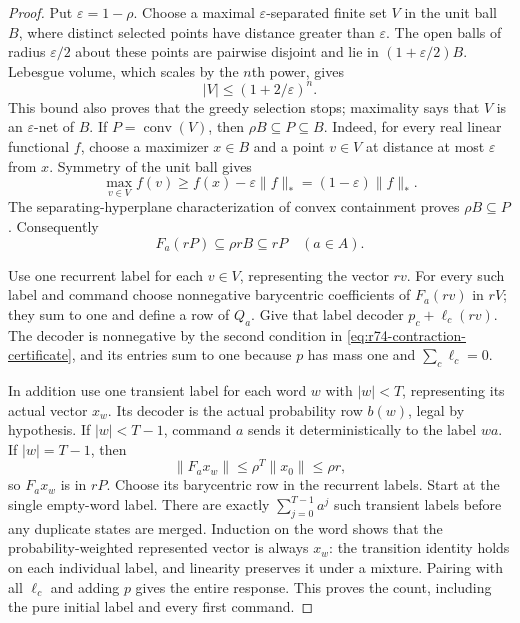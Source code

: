 \begin{proof}
Put $\varepsilon=1-\rho$. Choose a maximal $\varepsilon$-separated finite
set $V$ in the unit ball $B$, where distinct selected points have distance
greater than $\varepsilon$. The open balls of radius $\varepsilon/2$ about
these points are pairwise disjoint and lie in $(1+\varepsilon/2)B$.
Lebesgue volume, which scales by the $n$th power, gives
\[
 |V|\le (1+2/\varepsilon)^n.
\]
This bound also proves that the greedy selection stops; maximality says
that $V$ is an $\varepsilon$-net of $B$. If $P=\operatorname{conv}(V)$,
then $\rho B\subseteq P\subseteq B$. Indeed, for every real linear
functional $f$, choose a maximizer $x\in B$ and a point $v\in V$ at
distance at most $\varepsilon$ from $x$. Symmetry of the unit ball gives
\[
 \max_{v\in V} f(v)\ge f(x)-\varepsilon\|f\|_*
 =(1-\varepsilon)\|f\|_*.
\]
The separating-hyperplane characterization of convex containment proves
$\rho B\subseteq P$. Consequently
\[
 F_a(rP)\subseteq\rho rB\subseteq rP
 \quad(a\in A).
\]

Use one recurrent label for each $v\in V$, representing the vector $rv$.
For every such label and command choose nonnegative barycentric coefficients
of $F_a(rv)$ in $rV$; they sum to one and define a row of $Q_a$. Give that
label decoder $p_c+\ell_c(rv)$. The decoder is nonnegative by the second
condition in \eqref{eq:r74-contraction-certificate}, and its entries sum
to one because $p$ has mass one and $\sum_c\ell_c=0$.

In addition use one transient label for each word $w$ with $|w|<T$,
representing its actual vector $x_w$. Its decoder is the actual probability
row $b(w)$, legal by hypothesis. If $|w|<T-1$, command $a$ sends it
deterministically to the label $wa$. If $|w|=T-1$, then
\[
 \|F_ax_w\|\le\rho^T\|x_0\|\le\rho r,
\]
so $F_ax_w$ is in $rP$. Choose its barycentric row in the recurrent labels.
Start at the single empty-word label. There are exactly
$\sum_{j=0}^{T-1}a^j$ such transient labels before any duplicate states
are merged. Induction on the word shows that the probability-weighted
represented vector is always $x_w$: the transition identity holds on
each individual label, and linearity preserves it under a mixture. Pairing
with all $\ell_c$ and adding $p$ gives the entire response. This proves
the count, including the pure initial label and every first command.
\end{proof}

